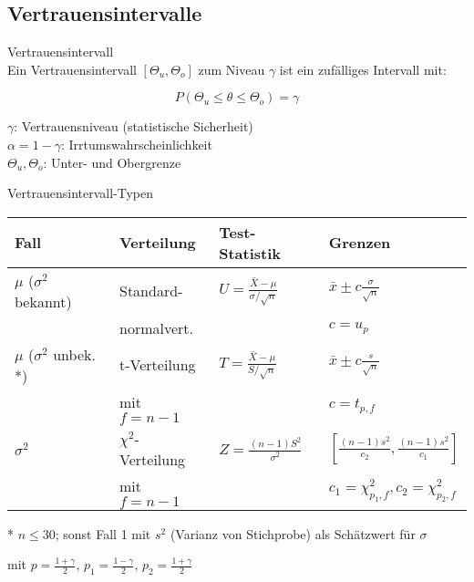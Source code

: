 \subsection{Vertrauensintervalle}

\begin{definition}{Vertrauensintervall}\\
Ein Vertrauensintervall $[\Theta_u,\Theta_o]$ zum Niveau $\gamma$ ist ein zufälliges Intervall mit:

\[P(\Theta_u \leq \theta \leq \Theta_o) = \gamma\]

$\gamma$: Vertrauensniveau (statistische Sicherheit)\\
$\alpha = 1-\gamma$: Irrtumswahrscheinlichkeit\\
$\Theta_u, \Theta_o$: Unter- und Obergrenze
\end{definition}

\begin{concept}{Vertrauensintervall-Typen}
\begin{center}
\begin{tabular}{|l|l|l|l|}
\hline
Fall & Verteilung & Test-Statistik & Grenzen \\
\hline
$\mu$ ($\sigma^2$ bekannt) & Standard- & $U = \frac{\bar{X}-\mu}{\sigma/\sqrt{n}}$ & $\bar{x} \pm c\frac{\sigma}{\sqrt{n}}$ \\
& normalvert. & & $c = u_p$ \\
\hline
$\mu$ ($\sigma^2$ unbek. *) & t-Verteilung & $T = \frac{\bar{X}-\mu}{S/\sqrt{n}}$ & $\bar{x} \pm c\frac{s}{\sqrt{n}}$ \\
& mit $f=n-1$ & & $c = t_{p,f}$ \\
\hline
$\sigma^2$ & $\chi^2$-Verteilung & $Z = \frac{(n-1)S^2}{\sigma^2}$ & $[\frac{(n-1)s^2}{c_2}, \frac{(n-1)s^2}{c_1}]$ \\
& mit $f=n-1$ & & $c_1 = \chi^2_{p_1,f}, c_2 = \chi^2_{p_2,f}$ \\
\hline
\end{tabular}
\end{center}

* $n \leq 30$; sonst Fall 1 mit $s^2$ (Varianz von Stichprobe) als Schätzwert für $\sigma$

mit $p = \frac{1+\gamma}{2}$, $p_1 = \frac{1-\gamma}{2}$, $p_2 = \frac{1+\gamma}{2}$
\end{concept}

